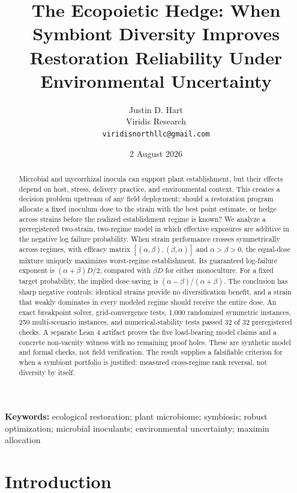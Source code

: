 \documentclass[10pt,twocolumn]{article}
\title{\textbf{The Ecopoietic Hedge: When Symbiont Diversity Improves Restoration Reliability Under Environmental Uncertainty}}
\author{Justin D. Hart\\Viridis Research\\\texttt{viridisnorthllc@gmail.com}}
\date{2 August 2026}
\begin{document}
\maketitle

\begin{abstract}
Microbial and mycorrhizal inocula can support plant establishment, but their
effects depend on host, stress, delivery practice, and environmental context.
This creates a decision problem upstream of any field deployment: should a
restoration program allocate a fixed inoculum dose to the strain with the best
point estimate, or hedge across strains before the realized establishment
regime is known? We analyze a preregistered two-strain, two-regime model in
which effective exposures are additive in the negative log failure
probability. When strain performance crosses symmetrically across regimes,
with efficacy matrix $[(\alpha,\beta),(\beta,\alpha)]$ and
$\alpha>\beta>0$, the equal-dose mixture uniquely maximizes worst-regime
establishment. Its guaranteed log-failure exponent is
$(\alpha+\beta)D/2$, compared with $\beta D$ for either monoculture. For a
fixed target probability, the implied dose saving is
$(\alpha-\beta)/(\alpha+\beta)$. The conclusion has sharp negative
controls: identical strains provide no diversification benefit, and a strain
that weakly dominates in every modeled regime should receive the entire dose.
An exact breakpoint solver, grid-convergence tests, 1,000 randomized symmetric
instances, 250 multi-scenario instances, and numerical-stability tests passed
32 of 32 preregistered checks. A separate Lean 4 artifact proves the five
load-bearing model claims and a concrete non-vacuity witness with no remaining
proof holes. These are synthetic model and formal checks, not field
verification. The result supplies a falsifiable criterion for when a
symbiont portfolio is justified: measured cross-regime rank reversal, not
diversity by itself.
\end{abstract}

\noindent\textbf{Keywords:} ecological restoration; plant microbiome;
symbiosis; robust optimization; microbial inoculants; environmental
uncertainty; maximin allocation

\section{Introduction}
\end{document}
